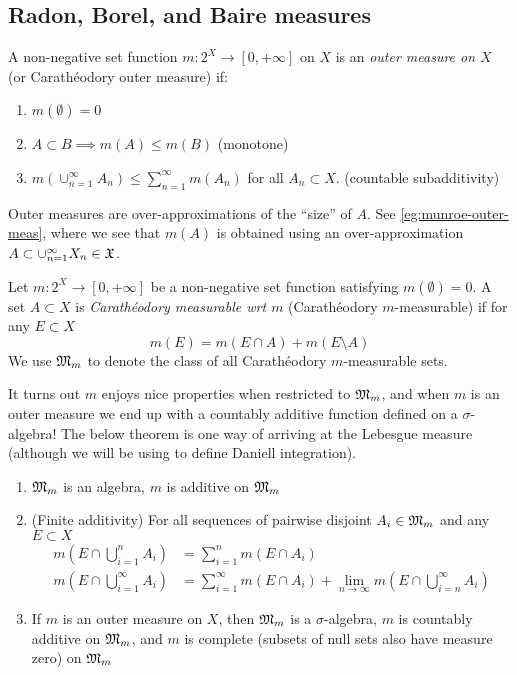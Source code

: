 \subsection{Radon, Borel, and Baire measures}

\begin{definition}
  A non-negative set function $m : 2^X \to [0, +\infty]$ on $X$
  is an \emph{outer measure on $X$} (or Carath\'eodory outer measure)
  if:
  \begin{enumerate}
    \item $m(\emptyset) = 0$
    \item $A \subset B \implies m(A) \leq m(B)$ (monotone)
    \item $m\left( \cup_{n=1}^\infty A_n\right) \leq \sum_{n=1}^\infty m(A_n)$
      for all $A_n \subset X$. (countable subadditivity)
  \end{enumerate}
\end{definition}

Outer measures are over-approximations of the ``size'' of $A$.
See \cref{eg:munroe-outer-meas}, where we see that $m(A)$ is obtained
using an over-approximation $A \subset \cup_{n=1}^\infty X_n \in \mathfrak{X}$.

\begin{definition}
  Let $m : 2^X \to [0, +\infty]$ be a non-negative set function
  satisfying $m(\emptyset) = 0$.
  A set $A \subset X$ is \emph{Carath\'eodory measurable wrt
  $m$} (Carath\'eodory $m$-measurable) if for any $E \subset X$
  \[
    m(E) = m(E \cap A) + m(E \setminus A)
  \]
  We use $\mathfrak{M}_m$ to denote the class of all Carath\'eodory $m$-measurable sets.
\end{definition}

It turns out $m$ enjoys nice properties when restricted to $\mathfrak{M}_m$, and when
$m$ is an outer measure we end up with a countably additive function defined
on a $\sigma$-algebra!
The below theorem is one way of arriving at the Lebesgue measure (although
we will be using to define Daniell integration).

\begin{theorem}
  \label{thm:caratheodory-construction}
  \begin{enumerate}
    \item $\mathfrak{M}_m$ is an algebra, $m$ is additive on $\mathfrak{M}_m$
    \item (Finite additivity) For all sequences of pairwise disjoint
      $A_i \in \mathfrak{M}_m$ and any $E \subset X$
      \begin{align*}
        m\left(E \cap \bigcup_{i=1}^n A_i\right) &= \sum_{i=1}^n m(E \cap A_i) \\
        m\left(E \cap \bigcup_{i=1}^\infty A_i\right)
        &= \sum_{i=1}^\infty m(E \cap A_i) + \lim_{n \to \infty} m\left(E \cap \bigcup_{i=n}^\infty A_i\right)
      \end{align*}
    \item If $m$ is an outer measure on $X$, then $\mathfrak{M}_m$ is a $\sigma$-algebra,
      $m$ is countably additive on $\mathfrak{M}_m$, and
      $m$ is complete (subsets of null sets also have measure zero) on $\mathfrak{M}_m$
  \end{enumerate}
\end{theorem}

